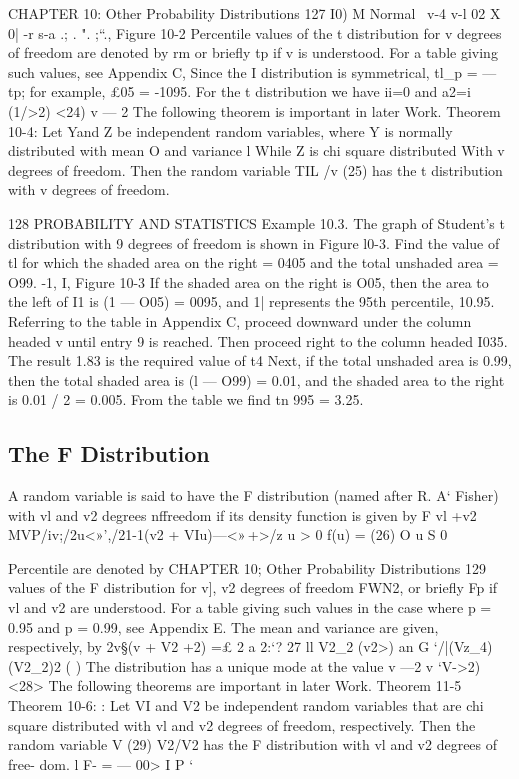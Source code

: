 {{{CHAPTER 10: Other Probability Distributions 127
I0)
M Normal
\
v-4
v-l
02 X
0|
-r s-a .; . ". ;“.,
Figure 10-2
Percentile values of the t distribution for v degrees of freedom
are denoted by rm or brieﬂy tp if v is understood. For a table giving
such values, see Appendix C, Since the I distribution is symmetrical,
tl_p = —tp; for example, £05 = -1095.
For the t distribution we have
ii=0 and a2=i (1/>2) <24)
v — 2
The following theorem is important in later Work.
Theorem 10-4: Let Yand Z be independent random variables, where
Y is normally distributed with mean O and variance l
While Z is chi square distributed With v degrees of
freedom. Then the random variable
TIL
\Z/v (25)
has the t distribution with v degrees of freedom.



128 PROBABILITY AND STATISTICS
Example 10.3. The graph of Student’s t distribution with 9 degrees
of freedom is shown in Figure l0-3. Find the value of tl for which the
shaded area on the right = 0405 and the total unshaded area = O99.
-1, I,
Figure 10-3
If the shaded area on the right is O05, then the area to the left of I1 is (1
— O05) = 0095, and 1| represents the 95th percentile, 10.95. Referring to
the table in Appendix C, proceed downward under the column headed v
until entry 9 is reached. Then proceed right to the column headed I035.
The result 1.83 is the required value of t4
Next, if the total unshaded area is 0.99, then the total shaded area
is (l — O99) = 0.01, and the shaded area to the right is 0.01 / 2 = 0.005.
From the table we ﬁnd tn 995 = 3.25.
\subsection{The F Distribution}
A random variable is said to have the F distribution (named after R. A‘
Fisher) with vl and v2 degrees nffreedom if its density function is given
by
F vl +v2
MVP/iv;/2u<»',/21-1(v2 + VIu)—<»\,+\@>/z u > 0
f(u) =  (26)
O u S 0



Percentile
are denoted by
CHAPTER 10; Other Probability Distributions 129
values of the F distribution for v], v2 degrees of freedom
FWN2, or brieﬂy Fp if vl and v2 are understood.
For a table giving such values in the case where p = 0.95 and p =
0.99, see Appendix E.
The mean
and variance are given, respectively, by
2v§(v + V2 +2)
=£ 2 a 2:‘? 27
ll V2_2 (v2>) an G ‘/|(Vz_4)(V2_2)2 ( )
The distribution has a unique mode at the value
v —2 v
  ‘V->2) <28>
The following theorems are important in later Work.
Theorem 11-5
Theorem 10-6:
: Let VI and V2 be independent random variables that
are chi square distributed with vl and v2 degrees of
freedom, respectively. Then the random variable
V  (29)
V2/V2
has the F distribution with vl and v2 degrees of free-
dom.
l
F-  = — 00>
I P ‘ 



}}}
